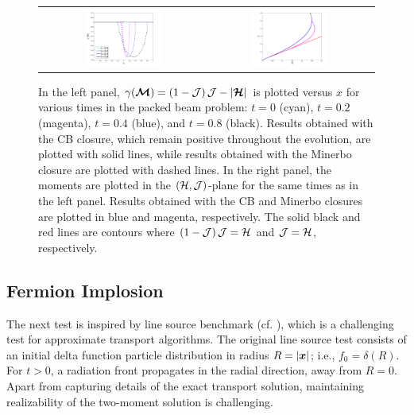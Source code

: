\begin{figure}[h]
  \centering
  \begin{tabular}{cc}
    \includegraphics[width=0.485\textwidth]{figures/PackedBeam_Realizability} &
    \includegraphics[width=0.485\textwidth]{figures/PackedBeam_RealizableDomain}
  \end{tabular}
   \caption{In the left panel, $\gamma(\boldsymbol{\mathcal{M}})=(1-\mathcal{J})\,\mathcal{J}-|\boldsymbol{\mathcal{H}}|$ is plotted versus $x$ for various times in the packed beam problem: $t=0$ (cyan), $t=0.2$ (magenta), $t=0.4$ (blue), and $t=0.8$ (black).  Results obtained with the CB closure, which remain positive throughout the evolution, are plotted with solid lines, while results obtained with the Minerbo closure are plotted with dashed lines.  In the right panel, the moments are plotted in the $(\mathcal{H},\mathcal{J})$-plane for the same times as in the left panel.  Results obtained with the CB and Minerbo closures are plotted in blue and magenta, respectively.  The solid black and red lines are contours where $(1-\mathcal{J})\,\mathcal{J}=\mathcal{H}$ and $\mathcal{J}=\mathcal{H}$, respectively.}
  \label{fig:PackedBeam_Realizability}
\end{figure}

\subsection{Fermion Implosion}

The next test is inspired by line source benchmark (cf. \cite{brunner_2002,garrettHauck_2013}), which is a challenging test for approximate transport algorithms.  
The original line source test consists of an initial delta function particle distribution in radius $R=|\boldsymbol{x}|$; i.e., $f_{0}=\delta(R)$.  
For $t>0$, a radiation front propagates in the radial direction, away from $R=0$.  
Apart from capturing details of the exact transport solution, maintaining realizability of the two-moment solution is challenging.  

